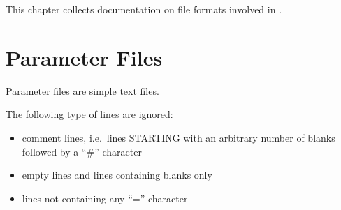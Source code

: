 
%
%
%

This chapter collects documentation on file formats involved in \ASKI{}.
%
\section{Parameter Files} \label{files,sec:parfiles}
%
Parameter files are simple text files.

The following type of lines are ignored:
\begin{itemize}
\item comment lines, i.e.\ lines STARTING with an arbitrary number of blanks followed by a ``\#'' character
\item empty lines and lines containing blanks only
\item lines not containing any ``='' character
\end{itemize}

